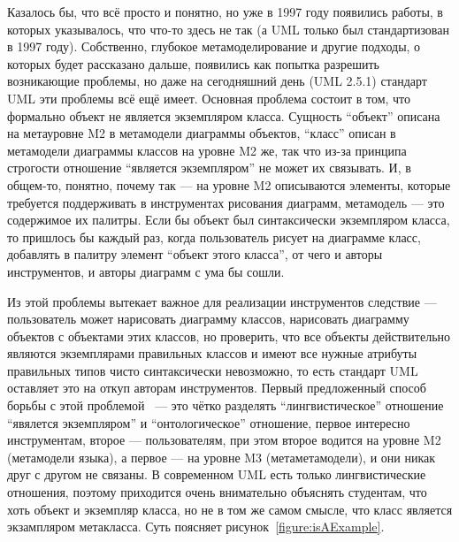 \documentclass[a5paper]{article}
\begin{document}
Казалось бы, что всё просто и понятно, но уже в 1997 году появились работы, в которых указывалось, что что-то здесь не так (а UML только был стандартизован в 1997 году). Собственно, глубокое метамоделирование и другие подходы, о которых будет рассказано дальше, появились как попытка разрешить возникающие проблемы, но даже на сегодняшний день (UML 2.5.1) стандарт UML эти проблемы всё ещё имеет. Основная проблема состоит в том, что формально объект не является экземпляром класса. Сущность ``объект'' описана на метауровне M2 в метамодели диаграммы объектов, ``класс'' описан в метамодели диаграммы классов на уровне M2 же, так что из-за принципа строгости отношение ``является экземпляром'' не может их связывать. И, в общем-то, понятно, почему так --- на уровне M2 описываются элементы, которые требуется поддерживать в инструментах рисования диаграмм, метамодель --- это содержимое их палитры. Если бы объект был синтаксически экземпляром класса, то пришлось бы каждый раз, когда пользователь рисует на диаграмме класс, добавлять в палитру элемент ``объект этого класса'', от чего и авторы инструментов, и авторы диаграмм с ума бы сошли.

Из этой проблемы вытекает важное для реализации инструментов следствие --- пользователь может нарисовать диаграмму классов, нарисовать диаграмму объектов с объектами этих классов, но проверить, что все объекты действительно являются экземплярами правильных классов и имеют все нужные атрибуты правильных типов чисто синтаксически невозможно, то есть стандарт UML оставляет это на откуп авторам инструментов. Первый предложенный способ борьбы с этой проблемой~\cite{bezivin1997ontology} --- это чётко разделять ``лингвистическое'' отношение ``явялется экземпляром'' и ``онтологическое'' отношение, первое интересно инструментам, второе --- пользователям, при этом второе водится на уровне M2 (метамодели языка), а первое --- на уровне M3 (метаметамодели), и они никак друг с другом не связаны. В современном UML есть только лингвистические отношения, поэтому приходится очень внимательно объяснять студентам, что хоть объект и экземпляр класса, но не в том же самом смысле, что класс является экзампляром метакласса. Суть поясняет рисунок~\ref{figure:isAExample}.
\end{document}
